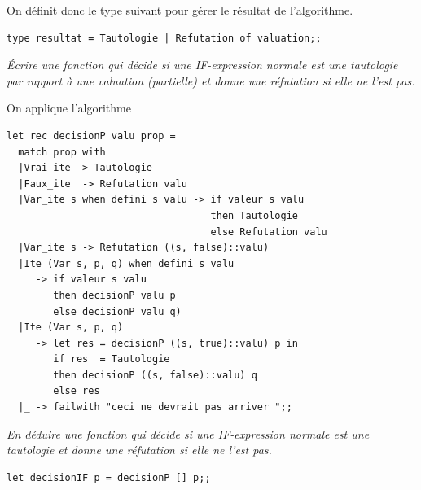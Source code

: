 \bigskip
On définit donc le type suivant pour gérer le résultat de l'algorithme.
\begin{lstlisting}
type resultat = Tautologie | Refutation of valuation;;
\end{lstlisting}
\begin{Exercise}\it 
Écrire une fonction  qui décide si une IF-expression normale est une tautologie par rapport à une valuation (partielle) et donne une réfutation si elle ne l'est pas.
\end{Exercise}
\begin{Answer} On applique l'algorithme
\begin{lstlisting}
let rec decisionP valu prop =
  match prop with
  |Vrai_ite -> Tautologie
  |Faux_ite  -> Refutation valu
  |Var_ite s when defini s valu -> if valeur s valu
                                   then Tautologie
                                   else Refutation valu
  |Var_ite s -> Refutation ((s, false)::valu)
  |Ite (Var s, p, q) when defini s valu  
     -> if valeur s valu 
        then decisionP valu p
        else decisionP valu q)
  |Ite (Var s, p, q) 
     -> let res = decisionP ((s, true)::valu) p in
        if res  = Tautologie
        then decisionP ((s, false)::valu) q
        else res
  |_ -> failwith "ceci ne devrait pas arriver ";;
\end{lstlisting}
\end{Answer}
\begin{Exercise}\it
En déduire une fonction  qui décide si une IF-expression normale est une tautologie et donne une réfutation si elle ne l'est pas.
\end{Exercise}
\begin{Answer} 
\begin{lstlisting}
let decisionIF p = decisionP [] p;;
\end{lstlisting}
\end{Answer}
